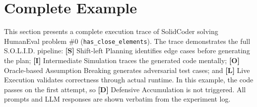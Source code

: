 \documentclass[11pt]{article}
\begin{document}
\section{Complete Example}
\label{app:example}


This section presents a complete execution trace of SolidCoder solving HumanEval problem \#0 (\texttt{has\_close\_elements}). The trace demonstrates the full S.O.L.I.D. pipeline: \textbf{[S]} Shift-left Planning identifies edge cases before generating the plan; \textbf{[I]} Intermediate Simulation traces the generated code mentally; \textbf{[O]} Oracle-based Assumption Breaking generates adversarial test cases; and \textbf{[L]} Live Execution validates correctness through actual runtime. In this example, the code passes on the first attempt, so \textbf{[D]} Defensive Accumulation is not triggered. All prompts and LLM responses are shown verbatim from the experiment log.

\vspace{3mm}
\end{document}
